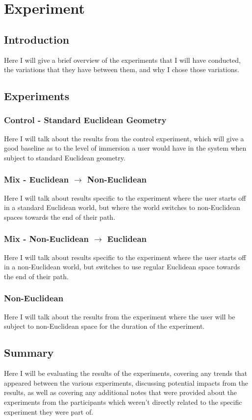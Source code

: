\chapter{Experiment}
\label{exp}

	\section{Introduction}
	Here I will give a brief overview of the experiments that I will have conducted, the variations that they have between them, and why I chose those variations.

	\section{Experiments}
		\subsection{Control - Standard Euclidean Geometry}
		Here I will talk about the results from the control experiment, which will give a good baseline as to the level of immersion a user would have in the system when subject to standard Euclidean geometry.

		\subsection{Mix - Euclidean $\rightarrow$ Non-Euclidean}
		Here I will talk about results specific to the experiment where the user starts off in a standard Euclidean world, but where the world switches to non-Euclidean spaces towards the end of their path.

		\subsection{Mix - Non-Euclidean $\rightarrow$ Euclidean}
		Here I will talk about results specific to the experiment where the user starts off in a non-Euclidean world, but switches to use regular Euclidean space towards the end of their path.

		\subsection{Non-Euclidean}
		Here I will talk about the results from the experiment where the user will be subject to non-Euclidean space for the duration of the experiment.

	\section{Summary}
	Here I will be evaluating the results of the experiments, covering any trends that appeared between the various experiments, discussing potential impacts from the results, as well as covering any additional notes that were provided about the experiments from the participants which weren't directly related to the specific experiment they were part of.

